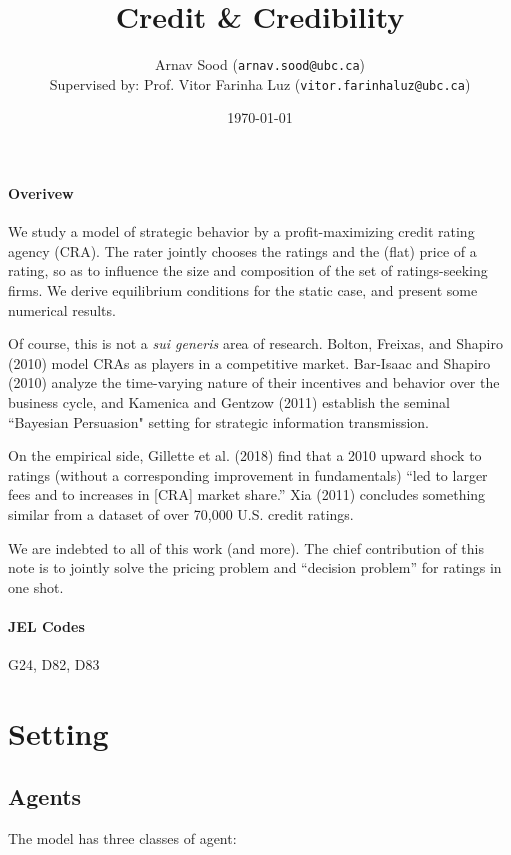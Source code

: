 \documentclass{article}
\title{Credit \& Credibility }
\author{Arnav Sood (\texttt{arnav.sood@ubc.ca}) \\ \normalsize Supervised by: Prof. Vitor Farinha Luz (\texttt{vitor.farinhaluz@ubc.ca})}
\date{\today}
\theoremstyle{definition}
\begin{document}
\maketitle

\paragraph*{Overivew} We study a model of strategic behavior by a profit-maximizing credit rating agency (CRA). The rater jointly chooses the ratings and the (flat) price of a rating, so as to influence the size and composition of the set of ratings-seeking firms. We derive equilibrium conditions for the static case, and present some numerical results. 

Of course, this is not a \emph{sui generis} area of research. Bolton, Freixas, and Shapiro (2010) model CRAs as players in a competitive market. Bar-Isaac and Shapiro (2010) analyze the time-varying nature of their incentives and behavior over the business cycle, and Kamenica and Gentzow (2011) establish the seminal ``Bayesian Persuasion" setting for strategic information transmission. 

On the empirical side, Gillette et al. (2018) find that a 2010 upward shock to ratings (without a corresponding improvement in fundamentals) ``led to larger fees and to increases in [CRA] market share.'' Xia (2011) concludes something similar from a dataset of over 70,000 U.S. credit ratings.

We are indebted to all of this work (and more). The chief contribution of this note is to jointly solve the pricing problem and ``decision problem'' for ratings in one shot.

\paragraph*{JEL Codes} G24, D82, D83

\newpage

\tableofcontents

\newpage

\section{Setting}

\subsection{Agents}

The model has three classes of agent: 
\end{document}
